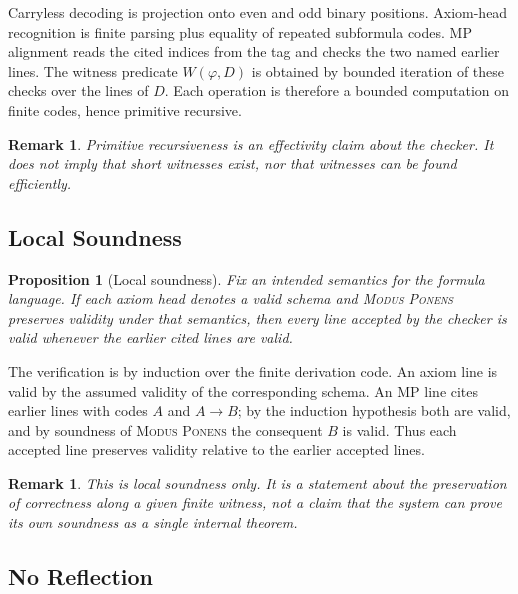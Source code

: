 \documentclass[letterpaper,10pt]{article}
\makeatletter
\theoremstyle{upright}
\theoremstyle{upright}
\newtheorem{remark}[theorem]{Remark}
\newtheorem{proposition}[theorem]{Proposition}
\renewenvironment{proof}[1][Proof]{%
	\par\pushQED{\qed}%
	\normalfont
	\topsep6\p@\@plus6\p@\relax
	\trivlist
	\item[\hskip\labelsep\slshape #1\@addpunct{.}]%
}{%
	\popQED\endtrivlist\@endpefalse
}
\makeatother
\begin{document}
\begin{proof}
	Carryless decoding is projection onto even and odd binary positions. Axiom-head recognition is finite parsing plus equality of repeated subformula codes. \textsc{MP} alignment reads the cited indices from the tag and checks the two named earlier lines. The witness predicate $W(\varphi,D)$ is obtained by bounded iteration of these checks over the lines of $D$. Each operation is therefore a bounded computation on finite codes, hence primitive recursive.
\end{proof}

\begin{remark}
	Primitive recursiveness is an effectivity claim about the checker. It does not imply that short witnesses exist, nor that witnesses can be found efficiently.
\end{remark}

\subsection{Local Soundness}\label{subsec:local-soundness}

\begin{proposition}[Local soundness]
	Fix an intended semantics for the formula language. If each axiom head denotes a valid schema and \textsc{Modus Ponens} preserves validity under that semantics, then every line accepted by the checker is valid whenever the earlier cited lines are valid.
\end{proposition}

\begin{proof}
	The verification is by induction over the finite derivation code. An axiom line is valid by the assumed validity of the corresponding schema. An \textsc{MP} line cites earlier lines with codes $A$ and $A\to B$; by the induction hypothesis both are valid, and by soundness of \textsc{Modus Ponens} the consequent $B$ is valid. Thus each accepted line preserves validity relative to the earlier accepted lines.
\end{proof}

\begin{remark}
	This is local soundness only. It is a statement about the preservation of correctness along a given finite witness, not a claim that the system can prove its own soundness as a single internal theorem.
\end{remark}

\subsection{No Reflection}\label{subsec:no-reflection}
\end{document}
